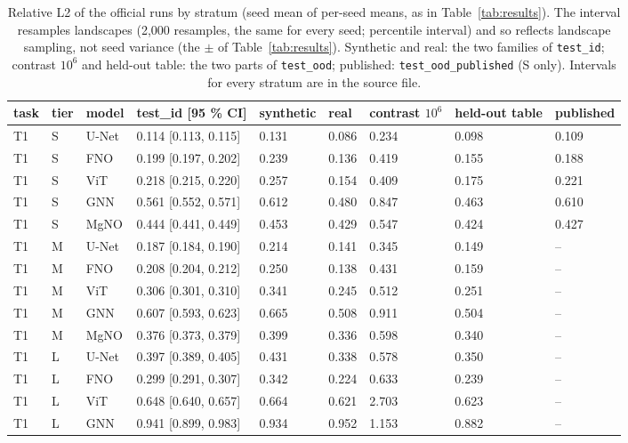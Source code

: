 \begin{table}[htbp]
\centering
\scriptsize
\setlength{\tabcolsep}{3.5pt}
\caption{Relative L2 of the official runs by stratum (seed mean of per-seed means, as in Table~\ref{tab:results}). The interval resamples landscapes (2,000 resamples, the same for every seed; percentile interval) and so reflects landscape sampling, not seed variance (the $\pm$ of Table~\ref{tab:results}). Synthetic and real: the two families of \texttt{test\_id}; contrast $10^6$ and held-out table: the two parts of \texttt{test\_ood}; published: \texttt{test\_ood\_published} (S only). Intervals for every stratum are in the source file.}
\label{tab:bootstrap}
\setlength{\tabcolsep}{2.2pt}
\begin{tabular}{lllllllll}
\toprule
task & tier & model & test\_id [95 \% CI] & synthetic & real & contrast $10^6$ & held-out table & published \\
\midrule
T1 & S & U-Net & 0.114 [0.113, 0.115] & 0.131 & 0.086 & 0.234 & 0.098 & 0.109 \\
T1 & S & FNO & 0.199 [0.197, 0.202] & 0.239 & 0.136 & 0.419 & 0.155 & 0.188 \\
T1 & S & ViT & 0.218 [0.215, 0.220] & 0.257 & 0.154 & 0.409 & 0.175 & 0.221 \\
T1 & S & GNN & 0.561 [0.552, 0.571] & 0.612 & 0.480 & 0.847 & 0.463 & 0.610 \\
T1 & S & MgNO & 0.444 [0.441, 0.449] & 0.453 & 0.429 & 0.547 & 0.424 & 0.427 \\
T1 & M & U-Net & 0.187 [0.184, 0.190] & 0.214 & 0.141 & 0.345 & 0.149 & -- \\
T1 & M & FNO & 0.208 [0.204, 0.212] & 0.250 & 0.138 & 0.431 & 0.159 & -- \\
T1 & M & ViT & 0.306 [0.301, 0.310] & 0.341 & 0.245 & 0.512 & 0.251 & -- \\
T1 & M & GNN & 0.607 [0.593, 0.623] & 0.665 & 0.508 & 0.911 & 0.504 & -- \\
T1 & M & MgNO & 0.376 [0.373, 0.379] & 0.399 & 0.336 & 0.598 & 0.340 & -- \\
T1 & L & U-Net & 0.397 [0.389, 0.405] & 0.431 & 0.338 & 0.578 & 0.350 & -- \\
T1 & L & FNO & 0.299 [0.291, 0.307] & 0.342 & 0.224 & 0.633 & 0.239 & -- \\
T1 & L & ViT & 0.648 [0.640, 0.657] & 0.664 & 0.621 & 2.703 & 0.623 & -- \\
T1 & L & GNN & 0.941 [0.899, 0.983] & 0.934 & 0.952 & 1.153 & 0.882 & -- \\

\end{tabular}
\end{table}
